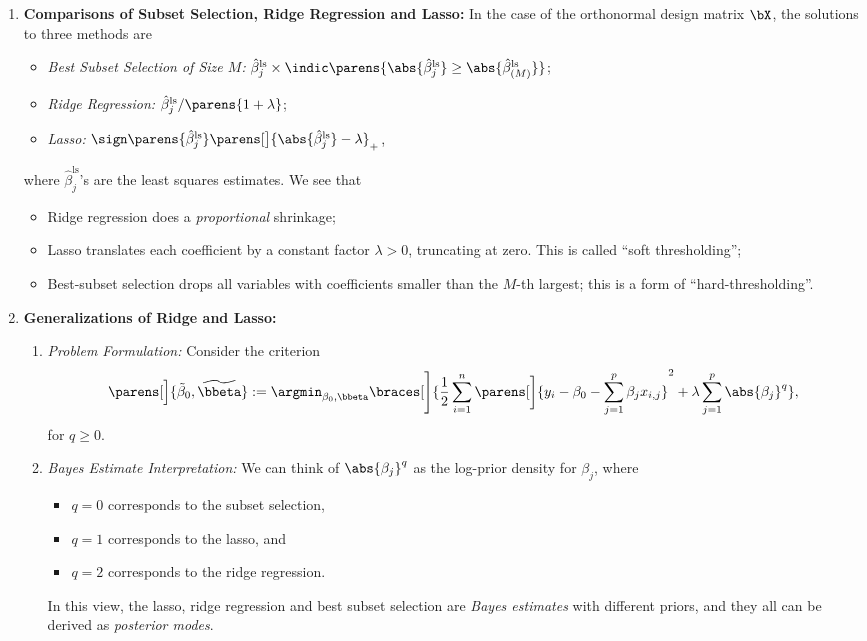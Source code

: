 \documentclass[12pt]{article}
\begin{document}
\begin{enumerate}[label=\textbf{\arabic*.}]
	\item \textbf{Comparisons of Subset Selection, Ridge Regression and Lasso:} In the case of the orthonormal design matrix $\bX$, the solutions to three methods are 
	\begin{itemize}
		\item \textit{Best Subset Selection of Size $M$:} $\hat{\beta}_j^{\mathrm{ls}} \times \indic \parens{\abs{\hat{\beta}_j^{\mathrm{ls}}} \ge \abs{\hat{\beta}_{(M)}^{\mathrm{ls}}}}$; 
		\item \textit{Ridge Regression:} $\hat{\beta}_j^{\mathrm{ls}} / \parens{1 + \lambda}$; 
		\item \textit{Lasso:} $\sign \parens{\hat{\beta}_j^{\mathrm{ls}}} \parens[\big]{\abs{\hat{\beta}_j^{\mathrm{ls}}} - \lambda}_+$, 
	\end{itemize}
	where $\hat{\beta}_j^{\mathrm{ls}}$'s are the least squares estimates. We see that 
	\begin{itemize}
		\item Ridge regression does a \textit{proportional} shrinkage; 
		\item Lasso translates each coefficient by a constant factor $\lambda > 0$, truncating at zero. This is called ``soft thresholding''; 
		\item Best-subset selection drops all variables with coefficients smaller than the $M$-th largest; this is a form of ``hard-thresholding''. 
	\end{itemize}
	
	\item \textbf{Generalizations of Ridge and Lasso:} 
	
	\begin{enumerate}
		\item \textit{Problem Formulation:} Consider the criterion 
		\begin{align}\label{gen.lag}
			\parens[\Big]{\tilde{\beta}_{0}, \widetilde{\bbeta}} := \argmin_{\beta_0, \bbeta} \braces[\Bigg]{\frac{1}{2} \sum_{i=1}^n \parens[\bigg]{y_i - \beta_0 - \sum_{j=1}^p \beta_j x_{i,j}}^2 + \lambda \sum_{j=1}^p \abs{\beta_j}^q}, 
		\end{align}
		for $q \ge 0$. 
		
		\item \textit{Bayes Estimate Interpretation:} We can think of $\abs{\beta_j}^q$ as the log-prior density for $\beta_j$, where 
		\begin{itemize}
			\item $q = 0$ corresponds to the subset selection, 
			\item $q = 1$ corresponds to the lasso, and 
			\item $q = 2$ corresponds to the ridge regression. 
		\end{itemize}
		In this view, the lasso, ridge regression and best subset selection are \textit{Bayes estimates} with different priors, and they all can be derived as \textit{posterior modes}. 
		

\end{enumerate}
\end{enumerate}
\end{document}
